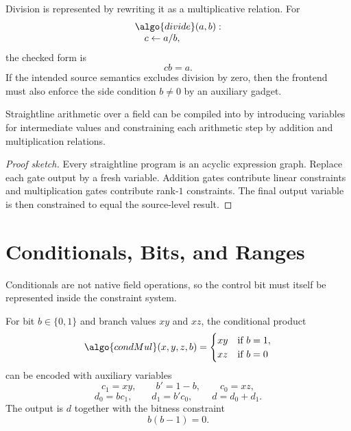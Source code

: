 \documentclass[11pt]{article}
\begin{document}
Division is represented by rewriting it as a multiplicative relation.  For
\[
\begin{array}{l}
\algo{divide}(a,b): \\
\quad c \leftarrow a/b,
\end{array}
\]
the checked form is
\[
  cb = a.
\]
If the intended source semantics excludes division by zero, then the frontend
must also enforce the side condition $b \neq 0$ by an auxiliary gadget.

\begin{proposition}
Straightline arithmetic over a field can be compiled into  by
introducing variables for intermediate values and constraining each arithmetic
step by addition and multiplication relations.
\end{proposition}

\begin{proof}[Proof sketch]
Every straightline program is an acyclic expression graph.  Replace each gate
output by a fresh variable.  Addition gates contribute linear constraints and
multiplication gates contribute rank-$1$ constraints.  The final output
variable is then constrained to equal the source-level result.
\end{proof}

\section{Conditionals, Bits, and Ranges}

Conditionals are not native field operations, so the control bit must itself be
represented inside the constraint system.

\begin{graybox}[title={Conditional-Multiplication Gadget}]
For bit $b \in \{0,1\}$ and branch values $xy$ and $xz$, the conditional
product
\[
  \algo{condMul}(x,y,z,b)
  =
  \begin{cases}
    xy & \text{if } b=1, \\
    xz & \text{if } b=0
  \end{cases}
\]
can be encoded with auxiliary variables
\[
  c_1 = xy,\qquad
  b' = 1-b,\qquad
  c_0 = xz,
\]
\[
  d_0 = bc_1,\qquad
  d_1 = b'c_0,\qquad
  d = d_0 + d_1.
\]
The output is $d$ together with the bitness constraint
\[
  b(b-1)=0.
\]
\end{graybox}
\end{document}
